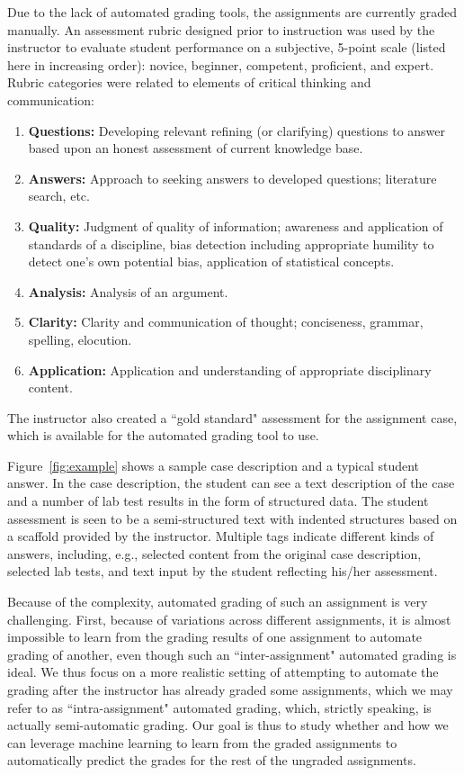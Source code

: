 Due to the lack of automated grading tools, the assignments are currently
graded manually. An assessment rubric designed prior to instruction was
used by the instructor to evaluate student performance on a subjective,
5-point scale (listed here in increasing order): novice, beginner,
competent, proficient, and expert. Rubric categories were related to
elements of critical thinking and communication:
\begin{enumerate}
\item {\bf Questions:} Developing relevant refining (or clarifying)
 questions to answer based upon an honest assessment of current knowledge
 base.
\item {\bf Answers:} Approach to seeking answers to developed
 questions; literature search, etc.
\item {\bf Quality:} Judgment of quality of information; awareness and
 application of standards of a discipline, bias detection including
 appropriate humility to detect one’s own potential bias, application of
 statistical concepts.
\item {\bf Analysis:} Analysis of an argument.
\item  {\bf Clarity:} Clarity and communication of thought; conciseness,
 grammar, spelling, elocution.
\item {\bf Application:} Application and understanding of appropriate
 disciplinary content.
\end{enumerate}

The instructor also created a ``gold standard" assessment for the
assignment case, which is available for the automated grading tool to use.

Figure~\ref{fig:example} shows a sample case description and a typical
student answer. In the case description, the student can see a text
description of the case and a number of lab test results in the form of
structured data. The student assessment is seen to be a semi-structured
text with indented structures based on a scaffold provided by the
instructor. Multiple tags indicate different kinds of answers, including,
e.g., selected content from the original case description, selected lab
tests, and text input by the student reflecting his/her assessment.

Because of the complexity, automated grading of such an assignment is very
challenging. First, because of variations across different assignments, it
is almost impossible to learn from the grading results of one assignment to
automate grading of another, even though such an ``inter-assignment"
automated grading is ideal.  We thus focus on a more realistic setting of
attempting to automate the grading after the instructor has already graded
some assignments, which we may refer to as ``intra-assignment" automated
grading, which, strictly speaking, is actually semi-automatic grading.  Our
goal is thus to study whether and how we can leverage machine learning to
learn from the graded assignments to automatically predict the grades for
the rest of the ungraded assignments.
